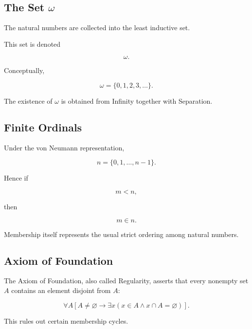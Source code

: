 \subsection{The Set \(\omega\)}
\label{subsec:set-omega}

The natural numbers are collected into the least inductive set.

This set is denoted

\[
\boxed{
\omega.
}
\]

Conceptually,

\[
\boxed{
\omega
=
\{
0,1,2,3,\ldots
\}.
}
\]

The existence of \(\omega\) is obtained from Infinity together with
Separation.

\subsection{Finite Ordinals}
\label{subsec:finite-ordinals}

Under the von Neumann representation,

\[
\boxed{
n
=
\{0,1,\ldots,n-1\}.
}
\]

Hence if

\[
m<n,
\]

then

\[
\boxed{
m\in n.
}
\]

Membership itself represents the usual strict ordering among natural
numbers.

\subsection{Axiom of Foundation}
\label{subsec:axiom-foundation}

The Axiom of Foundation, also called Regularity, asserts that every
nonempty set \(A\) contains an element disjoint from \(A\):

\[
\boxed{
\forall A
\left[
A\neq\varnothing
\rightarrow
\exists x
\left(
x\in A
\land
x\cap A=\varnothing
\right)
\right].
}
\]

This rules out certain membership cycles.


